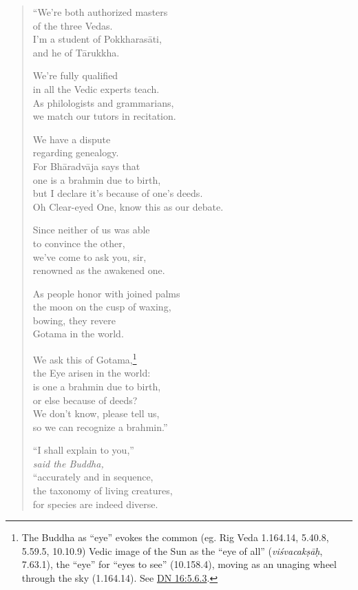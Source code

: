 \documentclass[12pt,openany]{book}%
\newcommand*{\scspeaker}[1]{\hspace{2em}\textit{#1}}
\begin{document}
\begin{verse}%
“We’re both authorized masters \\
of the three Vedas. \\
I’m a student of \textsanskrit{Pokkharasāti}, \\
and he of \textsanskrit{Tārukkha}. 

We’re fully qualified \\
in all the Vedic experts teach. \\
As philologists and grammarians, \\
we match our tutors in recitation. 

We have a dispute \\
regarding genealogy. \\
For \textsanskrit{Bhāradvāja} says that \\
one is a brahmin due to birth, \\
but I declare it’s because of one’s deeds. \\
Oh Clear-eyed One, know this as our debate. 

Since neither of us was able \\
to convince the other, \\
we’ve come to ask you, sir, \\
renowned as the awakened one. 

As people honor with joined palms \\
the moon on the cusp of waxing, \\
bowing, they revere \\
Gotama in the world. 

We ask this of Gotama,\footnote{The Buddha as “eye” evokes the common (eg. Rig Veda 1.164.14, 5.40.8, 5.59.5, 10.10.9) Vedic image of the Sun as the “eye of all” (\textit{\textsanskrit{viśvacakṣāḥ}}, 7.63.1), the “eye” for “eyes to see” (10.158.4), moving as an unaging wheel through the sky (1.164.14).  See \href{https://suttacentral.net/dn16/en/sujato\#5.6.3}{DN 16:5.6.3}. } \\
the Eye arisen in the world: \\
is one a brahmin due to birth, \\
or else because of deeds? \\
We don’t know, please tell us, \\
so we can recognize a brahmin.” 

“I shall explain to you,” \\
\scspeaker{said the Buddha, }\\
“accurately and in sequence, \\
the taxonomy of living creatures, \\
for species are indeed diverse. 


\end{verse}
\end{document}
